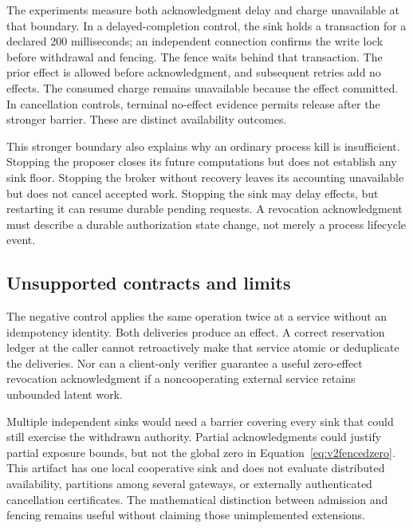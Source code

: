 The experiments measure both acknowledgment delay and charge unavailable at
that boundary. In a delayed-completion control, the sink holds a transaction
for a declared 200 milliseconds; an independent connection confirms the write
lock before withdrawal and fencing. The fence waits behind that transaction.
The prior effect is allowed before acknowledgment, and subsequent retries add
no effects. The consumed charge remains unavailable because the effect
committed. In cancellation controls, terminal no-effect evidence permits release
after the stronger barrier. These are distinct availability outcomes.

This stronger boundary also explains why an ordinary process kill is
insufficient. Stopping the proposer closes its future computations but does not
establish any sink floor. Stopping the broker without recovery leaves its
accounting unavailable but does not cancel accepted work. Stopping the sink may
delay effects, but restarting it can resume durable pending requests. A
revocation acknowledgment must describe a durable authorization state change,
not merely a process lifecycle event.

\subsection{Unsupported contracts and limits}
The negative control applies the same operation twice at a service without an
idempotency identity. Both deliveries produce an effect. A correct reservation
ledger at the caller cannot retroactively make that service atomic or deduplicate
the deliveries. Nor can a client-only verifier guarantee a useful zero-effect
revocation acknowledgment if a noncooperating external service retains
unbounded latent work.

Multiple independent sinks would need a barrier covering every sink that could
still exercise the withdrawn authority. Partial acknowledgments could justify
partial exposure bounds, but not the global zero in
Equation~\ref{eq:v2fencedzero}. This artifact has one local cooperative sink and
does not evaluate distributed availability, partitions among several gateways,
or externally authenticated cancellation certificates. The mathematical
distinction between admission and fencing remains useful without claiming those
unimplemented extensions.
